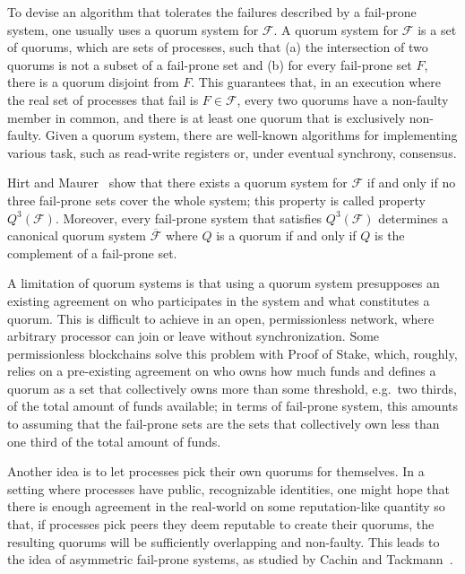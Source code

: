 \documentclass[11pt]{article}
\begin{document}
To devise an algorithm that tolerates the failures described by a fail-prone system, one usually uses a quorum system for $\mathcal{F}$. A quorum system for $\mathcal{F}$ is a set of quorums, which are sets of processes, such that (a) the intersection of two quorums is not a subset of a fail-prone set and (b) for every fail-prone set $F$, there is a quorum disjoint from $F$. This guarantees that, in an execution where the real set of processes that fail is $F\in\mathcal{F}$, every two quorums have a non-faulty member in common, and there is at least one quorum that is exclusively non-faulty. Given a quorum system, there are well-known algorithms for implementing various task, such as read-write registers or, under eventual synchrony, consensus.

Hirt and Maurer~\cite{hirtPlayerSimulationGeneral2000} show that there exists a quorum system for $\mathcal{F}$ if and only if no three fail-prone sets cover the whole system; this property is called property $Q^3(\mathcal{F})$. Moreover, every fail-prone system that satisfies $Q^3(\mathcal{F})$ determines a canonical quorum system $\overline{\mathcal{F}}$ where $Q$ is a quorum if and only if $Q$ is the complement of a fail-prone set. %

A limitation of quorum systems is that using a quorum system presupposes an existing agreement on who participates in the system and what constitutes a quorum.
This is difficult to achieve in an open, permissionless network, where arbitrary processor can join or leave without synchronization.
Some permissionless blockchains solve this problem with Proof of Stake, which, roughly, relies on a pre-existing agreement on who owns how much funds and defines a quorum as a set that collectively owns more than some threshold, e.g.\ two thirds, of the total amount of funds available; in terms of fail-prone system, this amounts to assuming that the fail-prone sets are the sets that collectively own less than one third of the total amount of funds.

Another idea is to let processes pick their own quorums for themselves. In a setting where processes have public, recognizable identities, one might hope that there is enough agreement in the real-world on some reputation-like quantity so that, if processes pick peers they deem reputable to create their quorums, the resulting quorums will be sufficiently overlapping and non-faulty. This leads to the idea of asymmetric fail-prone systems, as studied by Cachin and Tackmann~\cite{cachinAsymmetricDistributedTrust2019}.
\end{document}
